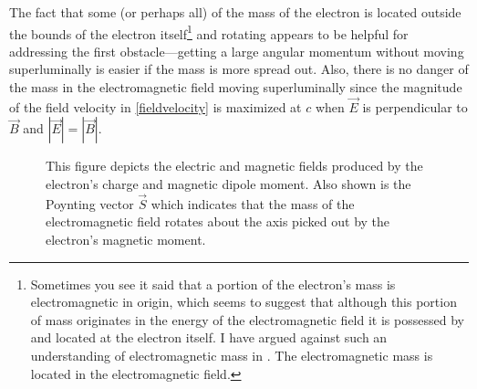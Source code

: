 \documentclass[onecolumn,secnumarabic,amsmath,amssymb,balancelastpage,nofootinbib]{article}
\begin{document}
The fact that some (or perhaps all) of the mass of the electron is located outside the bounds of the electron itself\footnote{Sometimes you see it said that a portion of the electron's mass is electromagnetic in origin, which seems to suggest that although this portion of mass originates in the energy of the electromagnetic field it is possessed by and located at the electron itself.  I have argued against such an understanding of electromagnetic mass in \citet{forcesonfields}.  The electromagnetic mass is located in the electromagnetic field.\label{whereisthemass}} and rotating appears to be helpful for addressing the first obstacle---getting a large angular momentum without moving superluminally is easier if the mass is more spread out.  Also, there is no danger of the mass in the electromagnetic field moving superluminally since the magnitude of the field velocity in \eqref{fieldvelocity} is maximized at $c$ when $\vec{E}$ is perpendicular to $\vec{B}$ and $|\vec{E}|=|\vec{B}|$.



\begin{figure}[htb]
\caption{This figure depicts the electric and magnetic fields produced by the electron's charge and magnetic dipole moment.  Also shown is the Poynting vector $\vec{S}$ which indicates that the mass of the electromagnetic field rotates about the axis picked out by the electron's magnetic moment.}
  \label{chargeddipole}
\end{figure}
\end{document}
